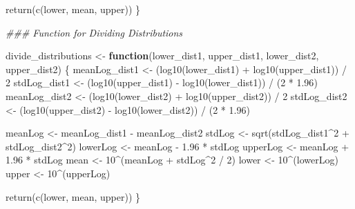 \documentclass[
  letterpaper,
  DIV=11,
  numbers=noendperiod]{scrartcl}
\newenvironment{Shaded}{\begin{snugshade}}{\end{snugshade}}
\newcommand{\ControlFlowTok}[1]{\textcolor[rgb]{0.00,0.23,0.31}{\textbf{#1}}}
\newcommand{\DecValTok}[1]{\textcolor[rgb]{0.68,0.00,0.00}{#1}}
\newcommand{\DocumentationTok}[1]{\textcolor[rgb]{0.37,0.37,0.37}{\textit{#1}}}
\newcommand{\FloatTok}[1]{\textcolor[rgb]{0.68,0.00,0.00}{#1}}
\newcommand{\FunctionTok}[1]{\textcolor[rgb]{0.28,0.35,0.67}{#1}}
\newcommand{\NormalTok}[1]{\textcolor[rgb]{0.00,0.23,0.31}{#1}}
\newcommand{\OtherTok}[1]{\textcolor[rgb]{0.00,0.23,0.31}{#1}}
\newcommand{\SpecialCharTok}[1]{\textcolor[rgb]{0.37,0.37,0.37}{#1}}
\begin{document}
\begin{Shaded}
\begin{Highlighting}[]
 \FunctionTok{return}\NormalTok{(}\FunctionTok{c}\NormalTok{(lower,  mean,  upper))}
\NormalTok{\}}

\DocumentationTok{\#\#\# Function for Dividing Distributions}

\NormalTok{divide\_distributions }\OtherTok{\textless{}{-}} \ControlFlowTok{function}\NormalTok{(lower\_dist1,  upper\_dist1,  lower\_dist2,  upper\_dist2)}
\NormalTok{\{}
\NormalTok{ meanLog\_dist1 }\OtherTok{\textless{}{-}}\NormalTok{ (}\FunctionTok{log10}\NormalTok{(lower\_dist1) }\SpecialCharTok{+} \FunctionTok{log10}\NormalTok{(upper\_dist1))  }\SpecialCharTok{/}  \DecValTok{2}
\NormalTok{ stdLog\_dist1 }\OtherTok{\textless{}{-}}\NormalTok{ (}\FunctionTok{log10}\NormalTok{(upper\_dist1) }\SpecialCharTok{{-}} \FunctionTok{log10}\NormalTok{(lower\_dist1))  }\SpecialCharTok{/}\NormalTok{  (}\DecValTok{2} \SpecialCharTok{*} \FloatTok{1.96}\NormalTok{)}
\NormalTok{ meanLog\_dist2 }\OtherTok{\textless{}{-}}\NormalTok{ (}\FunctionTok{log10}\NormalTok{(lower\_dist2) }\SpecialCharTok{+} \FunctionTok{log10}\NormalTok{(upper\_dist2))  }\SpecialCharTok{/}  \DecValTok{2}
\NormalTok{ stdLog\_dist2 }\OtherTok{\textless{}{-}}\NormalTok{ (}\FunctionTok{log10}\NormalTok{(upper\_dist2) }\SpecialCharTok{{-}} \FunctionTok{log10}\NormalTok{(lower\_dist2))  }\SpecialCharTok{/}\NormalTok{  (}\DecValTok{2} \SpecialCharTok{*} \FloatTok{1.96}\NormalTok{)}
 
 
\NormalTok{ meanLog }\OtherTok{\textless{}{-}}\NormalTok{ meanLog\_dist1 }\SpecialCharTok{{-}}\NormalTok{ meanLog\_dist2}
\NormalTok{ stdLog }\OtherTok{\textless{}{-}} \FunctionTok{sqrt}\NormalTok{(stdLog\_dist1}\SpecialCharTok{\^{}}\DecValTok{2} \SpecialCharTok{+}\NormalTok{ stdLog\_dist2}\SpecialCharTok{\^{}}\DecValTok{2}\NormalTok{)}
\NormalTok{ lowerLog }\OtherTok{\textless{}{-}}\NormalTok{ meanLog }\SpecialCharTok{{-}} \FloatTok{1.96} \SpecialCharTok{*}\NormalTok{ stdLog}
\NormalTok{ upperLog }\OtherTok{\textless{}{-}}\NormalTok{ meanLog }\SpecialCharTok{+} \FloatTok{1.96} \SpecialCharTok{*}\NormalTok{ stdLog}
\NormalTok{ mean }\OtherTok{\textless{}{-}} \DecValTok{10}\SpecialCharTok{\^{}}\NormalTok{(meanLog }\SpecialCharTok{+}\NormalTok{ stdLog}\SpecialCharTok{\^{}}\DecValTok{2}  \SpecialCharTok{/}  \DecValTok{2}\NormalTok{)}
\NormalTok{ lower }\OtherTok{\textless{}{-}} \DecValTok{10}\SpecialCharTok{\^{}}\NormalTok{(lowerLog)}
\NormalTok{ upper }\OtherTok{\textless{}{-}} \DecValTok{10}\SpecialCharTok{\^{}}\NormalTok{(upperLog)}
 
 \FunctionTok{return}\NormalTok{(}\FunctionTok{c}\NormalTok{(lower,  mean,  upper))}
\NormalTok{\}}
\end{Highlighting}
\end{Shaded}
\end{document}
